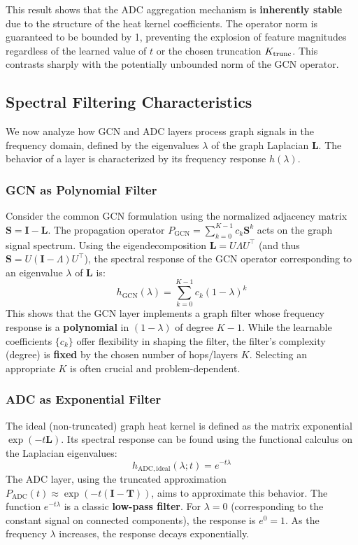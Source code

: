 \noindent This result shows that the ADC aggregation mechanism is \textbf{inherently stable} due to the structure of the heat kernel coefficients. The operator norm is guaranteed to be bounded by 1, preventing the explosion of feature magnitudes regardless of the learned value of $t$ or the chosen truncation $K_{\rm trunc}$. This contrasts sharply with the potentially unbounded norm of the GCN operator.

\subsection{Spectral Filtering Characteristics}
We now analyze how GCN and ADC layers process graph signals in the frequency domain, defined by the eigenvalues $\lambda$ of the graph Laplacian $\mathbf{L}$. The behavior of a layer is characterized by its frequency response $h(\lambda)$.

\subsubsection{GCN as Polynomial Filter}
Consider the common GCN formulation using the normalized adjacency matrix $\mathbf{S} = \mathbf{I} - \mathbf{L}$. The propagation operator $P_{\mathrm{GCN}} = \sum_{k=0}^{K-1} c_k \mathbf{S}^k$ acts on the graph signal spectrum. Using the eigendecomposition $\mathbf{L} = U \Lambda U^\top$ (and thus $\mathbf{S} = U (\mathbf{I} - \Lambda) U^\top$), the spectral response of the GCN operator corresponding to an eigenvalue $\lambda$ of $\mathbf{L}$ is:
\begin{equation}
h_{\mathrm{GCN}}(\lambda) = \sum_{k=0}^{K-1} c_k (1 - \lambda)^k
\end{equation}
This shows that the GCN layer implements a graph filter whose frequency response is a \textbf{polynomial} in $(1-\lambda)$ of degree $K-1$. While the learnable coefficients $\{c_k\}$ offer flexibility in shaping the filter, the filter's complexity (degree) is \textbf{fixed} by the chosen number of hops/layers $K$. Selecting an appropriate $K$ is often crucial and problem-dependent.

\subsubsection{ADC as Exponential Filter}
The ideal (non-truncated) graph heat kernel is defined as the matrix exponential $\exp(-t\mathbf{L})$. Its spectral response can be found using the functional calculus on the Laplacian eigenvalues:
\begin{equation}
h_{\mathrm{ADC, ideal}}(\lambda; t) = e^{-t\lambda}
\end{equation}
The ADC layer, using the truncated approximation $P_{\mathrm{ADC}}(t) \approx \exp(-t(\mathbf{I}-\mathbf{T}))$, aims to approximate this behavior. The function $e^{-t\lambda}$ is a classic \textbf{low-pass filter}. For $\lambda=0$ (corresponding to the constant signal on connected components), the response is $e^0 = 1$. As the frequency $\lambda$ increases, the response decays exponentially.

